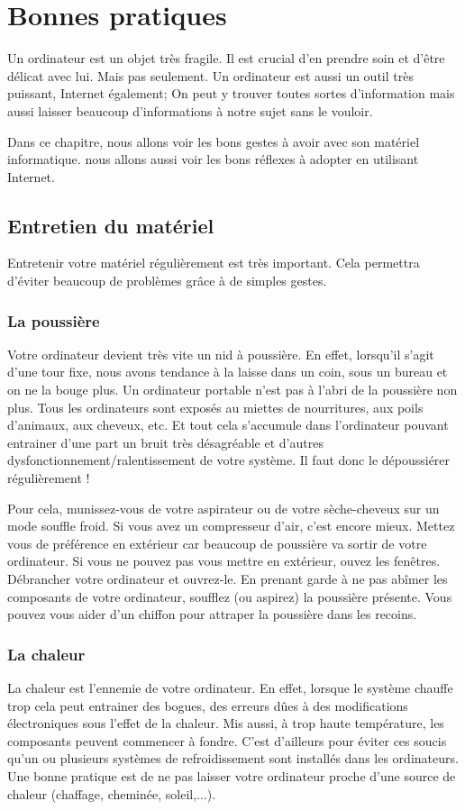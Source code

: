 \documentclass[12pt]{book}
\begin{document}
\chapter{Bonnes pratiques}
	Un ordinateur est un objet très fragile. 
	Il est crucial d'en prendre soin et d'être délicat avec lui.
	Mais pas seulement. 
	Un ordinateur est aussi un outil très puissant, Internet également;
	On peut y trouver toutes sortes d'information mais aussi laisser beaucoup d'informations à notre sujet sans le vouloir.\par
	Dans ce chapitre, nous allons voir les bons gestes à avoir avec son matériel informatique.
	nous allons aussi voir les bons réflexes à adopter en utilisant Internet.
	\section{Entretien du matériel}
		Entretenir votre matériel régulièrement est très important. 
		Cela permettra d'éviter beaucoup de problèmes grâce à de simples gestes.
		\subsection{La poussière}
			Votre ordinateur devient très vite un nid à poussière.
			En effet, lorsqu'il s'agit d'une tour fixe, nous avons tendance à la laisse dans un coin, sous un bureau et on ne la bouge plus.
			Un ordinateur portable n'est pas à l'abri de la poussière non plus.
			Tous les ordinateurs sont exposés au miettes de nourritures, aux poils d'animaux, aux cheveux, etc. Et tout cela s'accumule dans l'ordinateur pouvant entrainer d'une part un bruit très désagréable et d'autres dysfonctionnement/ralentissement de votre système.
			Il faut donc le dépoussiérer régulièrement !\par
			Pour cela, munissez-vous de votre aspirateur ou de votre sèche-cheveux sur un mode souffle froid.
			Si vous avez un compresseur d'air, c'est encore mieux.
			Mettez vous de préférence en extérieur car beaucoup de poussière va sortir de votre ordinateur.
			Si vous ne pouvez pas vous mettre en extérieur, ouvez les fenêtres.
			Débrancher votre ordinateur et ouvrez-le.
			En prenant garde à ne pas abîmer les composants de votre ordinateur, soufflez (ou aspirez) la poussière présente.
			Vous pouvez vous aider d'un chiffon pour attraper la poussière dans les recoins.
		\subsection{La chaleur}
			La chaleur est l'ennemie de votre ordinateur.
			En effet, lorsque le système chauffe trop cela peut entrainer des bogues, des erreurs dûes à des modifications électroniques sous l'effet de la chaleur.
			Mis aussi, à trop haute température, les composants peuvent commencer à fondre.
			C'est d'ailleurs pour éviter ces soucis qu'un ou plusieurs systèmes de refroidissement sont installés dans les ordinateurs. 
			Une bonne pratique est de ne pas laisser votre ordinateur proche d'une source de chaleur (chaffage, cheminée, soleil,...). 
\end{document}
